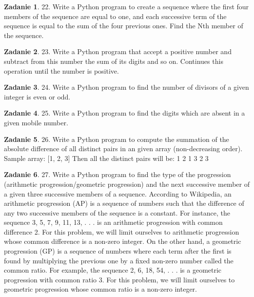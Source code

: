 \documentclass[11pt]{article}
\theoremstyle{definition}
\newtheorem{zadanie}{Zadanie}
\begin{document}
\begin{zadanie}


22. Write a Python program to create a sequence where the first four members of the sequence are equal to one, and each successive term of the sequence is equal to the sum of the four previous ones. Find the Nth member of the sequence. 

\end{zadanie}

\begin{zadanie}


23. Write a Python program that accept a positive number and subtract from this number the sum of its digits and so on. Continues this operation until the number is positive. 

\end{zadanie}

\begin{zadanie}


24. Write a Python program to find the number of divisors of a given integer is even or odd. 

\end{zadanie}

\begin{zadanie}


25. Write a Python program to find the digits which are absent in a given mobile number. 

\end{zadanie}

\begin{zadanie}


26. Write a Python program to compute the summation of the absolute difference of all distinct pairs in an given array (non-decreasing order). 
Sample array: [1, 2, 3]
Then all the distinct pairs will be:
1 2
1 3
2 3

\end{zadanie}

\begin{zadanie}


27. Write a Python program to find the type of the progression (arithmetic progression/geometric progression) and the next successive member of a given three successive members of a sequence. 
According to Wikipedia, an arithmetic progression (AP) is a sequence of numbers such that the difference of any two successive members of the sequence is a constant. For instance, the sequence 3, 5, 7, 9, 11, 13, . . . is an arithmetic progression with common difference 2. For this problem, we will limit ourselves to arithmetic progression whose common difference is a non-zero integer.
On the other hand, a geometric progression (GP) is a sequence of numbers where each term after the first is found by multiplying the previous one by a fixed non-zero number called the common ratio. For example, the sequence 2, 6, 18, 54, . . . is a geometric progression with common ratio 3. For this problem, we will limit ourselves to geometric progression whose common ratio is a non-zero integer.

\end{zadanie}
\end{document}
